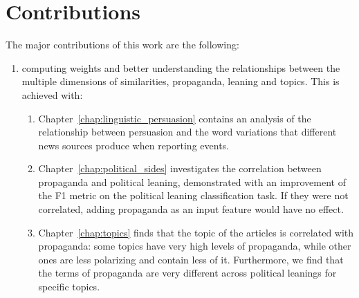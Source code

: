 \section{\statusgreen Contributions}
\label{sec:intro_contributions}

The major contributions of this work are the following:
\begin{enumerate}
    \item computing weights and better understanding the relationships between the multiple dimensions of similarities, propaganda, leaning and topics. This is achieved with:
    \begin{enumerate}
        \item Chapter~\ref{chap:linguistic_persuasion} contains an analysis of the relationship between persuasion and the word variations that different news sources produce when reporting events.
        \item Chapter~\ref{chap:political_sides} investigates the correlation between propaganda and political leaning, demonstrated with an improvement of the F1 metric on the political leaning classification task. If they were not correlated, adding propaganda as an input feature would have no effect.
        \item Chapter~\ref{chap:topics} finds that the topic of the articles is correlated with propaganda: some topics have very high levels of propaganda, while other ones are less polarizing and contain less of it. Furthermore, we find that the terms of propaganda are very different across political leanings for specific topics. %
        

\end{enumerate}
\end{enumerate}
